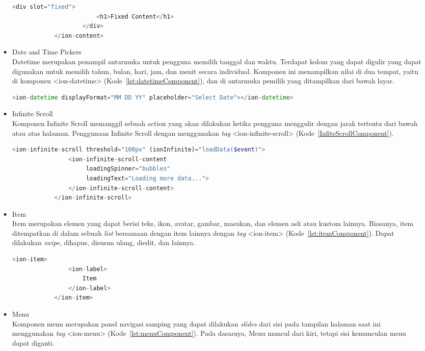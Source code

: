 \begin{itemize}
\begin{lstlisting}[language=php, label={lst:contentComponent}, caption=Potongan Kode Program dari Content Component]
					<div slot="fixed">
						<h1>Fixed Content</h1>
					</div>
			</ion-content>
	\end{lstlisting} 
	\item Date and Time Pickers\\
	Datetime merupakan penampil antarmuka untuk pengguna memilih tanggal dan waktu. Terdapat kolom yang dapat digulir yang dapat digunakan untuk memilih tahun, bulan, hari, jam, dan menit secara individual. Komponen ini menampilkan nilai di dua tempat, yaitu di komponen <ion-datetime> (Kode~\ref{lst:datetimeComponent}), dan di antarmuka pemilih yang ditampilkan dari bawah layar.
		\begin{lstlisting}[language=php, label={lst:datetimeComponent}, caption=Kode Program dari Datetime Component dengan Format Bulan-Hari-Tahun]
			<ion-datetime displayFormat="MM DD YY" placeholder="Select Date"></ion-datetime>
		\end{lstlisting} 
	\item Infinite Scroll	\\
	Komponen Infinite Scroll memanggil sebuah action yang akan dilakukan ketika pengguna menggulir dengan jarak tertentu dari bawah atau atas halaman. Penggunaan Infinite Scroll dengan menggunakan {\it tag} <ion-infinite-scroll> (Kode~\ref{InfiteScrollComponent}).
	\begin{lstlisting}[language=php, label={lst:InfiteScrollComponent}, caption=Potongan Kode Program dari Infinite Scroll Component]
			<ion-infinite-scroll threshold="100px" (ionInfinite)="loadData($event)">
				<ion-infinite-scroll-content
					 loadingSpinner="bubbles"
					 loadingText="Loading more data...">
				</ion-infinite-scroll-content>
			</ion-infinite-scroll>
	\end{lstlisting} 
	\item Item \\
	Item merupakan elemen yang dapat berisi teks, ikon, avatar, gambar, masukan, dan elemen asli atau kustom lainnya. Biasanya, item ditempatkan di dalam sebuah {\it list} bersamaan dengan item lainnya dengan {\it tag} <ion-item> (Kode~\ref{lst:itemComponent}). Dapat dilakukan {\it swipe}, dihapus, disusun ulang, diedit, dan lainnya.
	\begin{lstlisting}[language=php, label={lst:itemComponent}, caption=Potongan Kode Program dari Item Component]
			<ion-item>
				<ion-label>
					Item
				</ion-label>
			</ion-item>
	\end{lstlisting} 
	\item Menu \\
	Komponen menu merupakan panel navigasi samping yang dapat dilakukan {\it slides} dari sisi pada tampilan halaman saat ini menggunakan {\it tag} <ion-menu> (Kode~\ref{lst:menuComponent}). Pada dasarnya, Menu muncul dari kiri, tetapi sisi kemunculan menu dapat diganti. 


\end{itemize}
